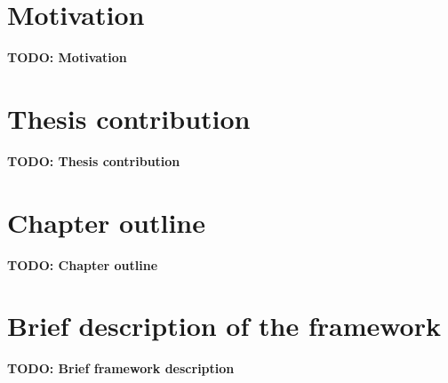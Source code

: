 \section{Motivation}
  {\color{red}\textbf{TODO: Motivation}}

\section{Thesis contribution}
  {\color{red}\textbf{TODO: Thesis contribution}}

\section{Chapter outline}
  {\color{red}\textbf{TODO: Chapter outline}}

\section{Brief description of the framework}
  {\color{red}\textbf{TODO: Brief framework description}}
